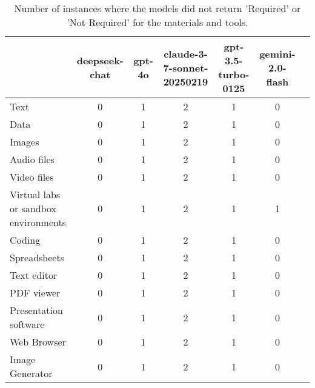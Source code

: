 \begin{table}
\caption{Number of instances where the models did not return 'Required' or 'Not Required' for the materials and tools.}
\begin{tabular}{lcccccc}
\toprule
 & deepseek-chat & gpt-4o & claude-3-7-sonnet-20250219 & gpt-3.5-turbo-0125 & gemini-2.0-flash \\
\midrule
Text & 0 & 1 & 2 & 1 & 0 \\
Data & 0 & 1 & 2 & 1 & 0 \\
Images & 0 & 1 & 2 & 1 & 0 \\
Audio files & 0 & 1 & 2 & 1 & 0 \\
Video files & 0 & 1 & 2 & 1 & 0 \\
Virtual labs or sandbox environments & 0 & 1 & 2 & 1 & 1 \\
Coding & 0 & 1 & 2 & 1 & 0 \\
Spreadsheets & 0 & 1 & 2 & 1 & 0 \\
Text editor & 0 & 1 & 2 & 1 & 0 \\
PDF viewer & 0 & 1 & 2 & 1 & 0 \\
Presentation software & 0 & 1 & 2 & 1 & 0 \\
Web Browser & 0 & 1 & 2 & 1 & 0 \\
Image Generator & 0 & 1 & 2 & 1 & 0 \\
\bottomrule
\end{tabular}
\end{table}
